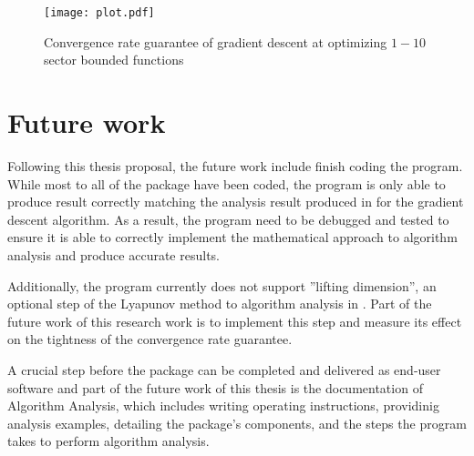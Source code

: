     
\begin{figure}[h]
    \centering
    \texttt{[image: plot.pdf]}
    \caption{Convergence rate guarantee of gradient descent at optimizing $1-10$ sector bounded functions}
    \label{plot_result}
\end{figure}

\section{Future work}
Following this thesis proposal, the future work include finish coding the program. While most to all of the package have been coded, the program is only able to produce result correctly matching the analysis result produced in \cite{tutorial} for the gradient descent algorithm. As a result, the program need to be debugged and tested to ensure it is able to correctly implement the mathematical approach to algorithm analysis and produce accurate results.

Additionally, the program currently does not support ''lifting dimension'', an optional step of the Lyapunov method to algorithm analysis in \cite{tutorial}. Part of the future work of this research work is to implement this step and measure its effect on the tightness of the convergence rate guarantee.

A crucial step before the package can be completed and delivered as end-user software and part of the future work of this thesis is the documentation of Algorithm Analysis, which includes writing operating instructions, providinig analysis examples, detailing the package's components, and the steps the program takes to perform algorithm analysis.